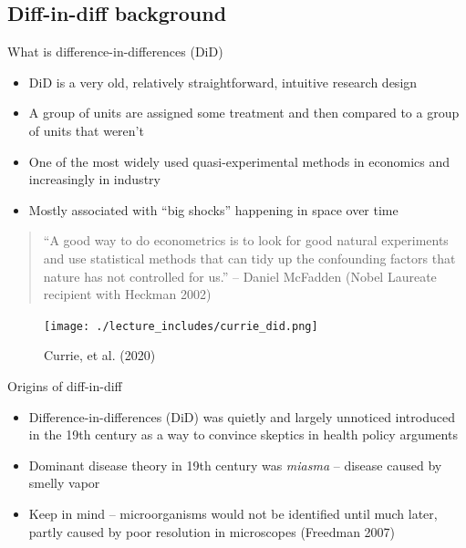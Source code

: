 \documentclass{beamer}
\begin{document}
\subsection{Diff-in-diff background}


\begin{frame}{What is difference-in-differences (DiD)}

\begin{itemize}
\item DiD is a very old, relatively straightforward, intuitive research design
\item A group of units are assigned some treatment and then compared to a group of units that weren't
\item One of the most widely used quasi-experimental methods in economics and increasingly in industry
\item Mostly associated with ``big shocks'' happening in space over time
\end{itemize}


\begin{quote}
``A good way to do econometrics is to look for good natural experiments and use statistical methods that can tidy up the confounding factors that nature has not controlled for us.'' -- Daniel McFadden (Nobel Laureate recipient with Heckman 2002)
\end{quote}

\end{frame}


\begin{frame}

	\begin{figure}
	\caption{Currie, et al. (2020)}
	\texttt{[image: ./lecture\_includes/currie\_did.png]}
	\end{figure}


\end{frame}




\begin{frame}{Origins of diff-in-diff}

\begin{itemize}
\item Difference-in-differences (DiD) was quietly and largely unnoticed introduced in the 19th century as a way to convince skeptics in health policy arguments
\item Dominant disease theory in 19th century was \emph{miasma} -- disease caused by smelly vapor
\item Keep in mind -- microorganisms would not be identified until much later, partly caused by poor resolution in microscopes (Freedman 2007)

\end{itemize}

\end{frame}
\end{document}
